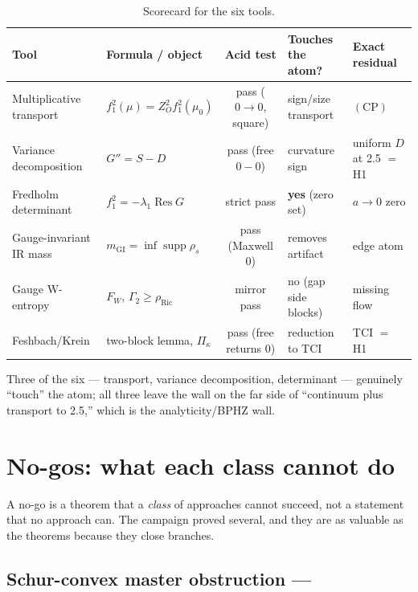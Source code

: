 \begin{table}[t]
\centering
\footnotesize
\begin{tabularx}{\textwidth}{@{}>{\raggedright\arraybackslash}p{3.1cm}
  >{\raggedright\arraybackslash}p{3.0cm}c
  >{\raggedright\arraybackslash}p{2.9cm}
  >{\raggedright\arraybackslash}X@{}}
\toprule
\textbf{Tool} & \textbf{Formula / object} & \textbf{Acid test} & \textbf{Touches the atom?} &
\textbf{Exact residual}\\
\midrule
Multiplicative transport & $f_1^2(\mu)=Z_O^2f_1^2(\mu_0)$ & pass ($0\to0$, square) &
  sign/size transport & $(\mathrm{CP})$\\
Variance decomposition & $G''=S-D$ & pass (free $0-0$) & curvature sign &
  uniform $D$ at 2.5 $=$ H1\\
Fredholm determinant & $f_1^2=-\lambda_1\operatorname{Res}G$ & strict pass &
  \textbf{yes} (zero set) & $a\to0$ zero\\
Gauge-invariant IR mass & $m_{\mathrm{GI}}=\inf\operatorname{supp}\rho_s$ &
  pass (Maxwell 0) & removes artifact & edge atom\\
Gauge W-entropy & $F_W$, $\Gamma_2\ge\rho_{\mathrm{Ric}}$ & mirror pass & no (gap side blocks) &
  missing flow\\
Feshbach/Krein & two-block lemma, $\Pi_\kappa$ & pass (free returns 0) &
  reduction to TCI & TCI $=$ H1\\
\bottomrule
\end{tabularx}
\caption{Scorecard for the six tools.}
\label{tab:tools}
\end{table}

Three of the six --- transport, variance decomposition, determinant --- genuinely ``touch'' the
atom; all three leave the wall on the far side of ``continuum plus transport to 2.5,'' which is
the analyticity/BPHZ wall.

\section{No-gos: what each class cannot do}
\label{sec:nogos}

A no-go is a theorem that a \emph{class} of approaches cannot succeed, not a statement that no
approach can. The campaign proved several, and they are as valuable as the theorems because they
close branches.

\subsection{Schur-convex master obstruction --- \LN}
\label{sec:schur}

